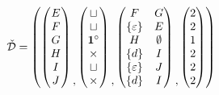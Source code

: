 \[
    \check{\mathcal{D}} = \left(
        \begin{pmatrix}
            E\\
            F\\
            G\\
            H\\
            I\\
            J
        \end{pmatrix}
        \begin{matrix}\\\\\\\\\\,\end{matrix}
        \begin{pmatrix}
            \sqcup\\
            \sqcup\\
            \mathbf{1}^\circ\\
            \times\\
            \sqcup\\
            \times
        \end{pmatrix}
        \begin{matrix}\\\\\\\\\\,\end{matrix}
        \begin{pmatrix}
            F & G\\
            \left\{\varepsilon\right\} & E\\
            H & \emptyset\\
            \left\{d\right\} & I\\
            \left\{\varepsilon\right\} & J\\
            \left\{d\right\} & I
        \end{pmatrix}
        \begin{matrix}\\\\\\\\\\,\end{matrix}
        \begin{pmatrix}
            2\\
            2\\
            1\\
            2\\
            2\\
            2
        \end{pmatrix}
    \right)
\]
